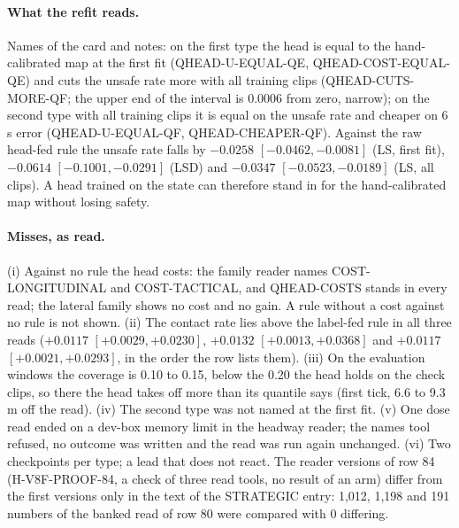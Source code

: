 \paragraph{What the refit reads.} Names of the card and notes: on the first type the head is equal to the hand-calibrated map at the first fit (QHEAD-U-EQUAL-QE, QHEAD-COST-EQUAL-QE) and cuts the unsafe rate more with all training clips (QHEAD-CUTS-MORE-QF; the upper end of the interval is 0.0006 from zero, narrow); on the second type with all training clips it is equal on the unsafe rate and cheaper on 6\,s error (QHEAD-U-EQUAL-QF, QHEAD-CHEAPER-QF). Against the raw head-fed rule the unsafe rate falls by $-0.0258$ $[-0.0462,-0.0081]$ (LS, first fit), $-0.0614$ $[-0.1001,-0.0291]$ (LSD) and $-0.0347$ $[-0.0523,-0.0189]$ (LS, all clips). A head trained on the state can therefore stand in for the hand-calibrated map without losing safety.

\paragraph{Misses, as read.} (i) Against no rule the head costs: the family reader names COST-LONGITUDINAL and COST-TACTICAL, and QHEAD-COSTS stands in every read; the lateral family shows no cost and no gain. A rule without a cost against no rule is not shown. (ii) The contact rate lies above the label-fed rule in all three reads ($+0.0117$ $[+0.0029,+0.0230]$, $+0.0132$ $[+0.0013,+0.0368]$ and $+0.0117$ $[+0.0021,+0.0293]$, in the order the row lists them). (iii) On the evaluation windows the coverage is 0.10 to 0.15, below the 0.20 the head holds on the check clips, so there the head takes off more than its quantile says (first tick, 6.6 to 9.3\,m off the read). (iv) The second type was not named at the first fit. (v) One dose read ended on a dev-box memory limit in the headway reader; the names tool refused, no outcome was written and the read was run again unchanged. (vi) Two checkpoints per type; a lead that does not react. The reader versions of row 84 (H-V8F-PROOF-84, a check of three read tools, no result of an arm) differ from the first versions only in the text of the STRATEGIC entry: 1,012, 1,198 and 191 numbers of the banked read of row 80 were compared with 0 differing.
